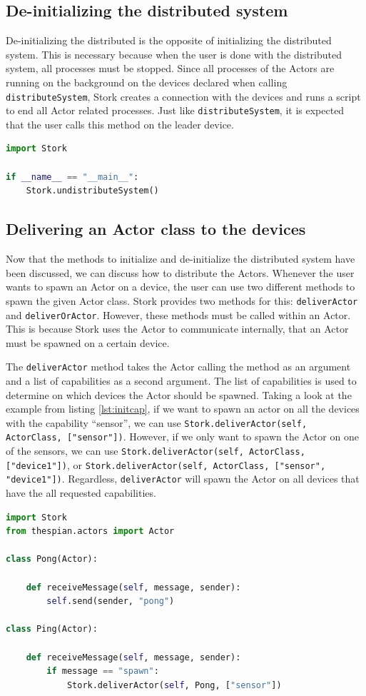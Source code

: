 \documentclass[a4paper]{article}
\begin{document}
\subsection{De-initializing the distributed system}
De-initializing the distributed is the opposite of initializing the distributed system. This is necessary because when the user is done with the distributed system, all processes must be stopped. Since all processes of the Actors are running on the background on the devices declared when calling \lstinline{distributeSystem}, Stork creates a connection with the devices and runs a script to end all Actor related processes. Just like \lstinline{distributeSystem}, it is expected that the user calls this method on the leader device.
\begin{lstlisting}[language=Python, caption=De-initializing the distributed system, label=lst:deinit]
import Stork

if __name__ == "__main__":
    Stork.undistributeSystem()
\end{lstlisting}
\subsection{Delivering an Actor class to the devices}
Now that the methods to initialize and de-initialize the distributed system have been discussed, we can discuss how to distribute the Actors. Whenever the user wants to spawn an Actor on a device, the user can use two different methods to spawn the given Actor class. Stork provides two methods for this: \lstinline|deliverActor| and \lstinline|deliverOrActor|. However, these methods must be called within an Actor. This is because Stork uses the Actor to communicate internally, that an Actor must be spawned on a certain device.

The \lstinline{deliverActor} method takes the Actor calling the method as an argument and a list of capabilities as a second argument. The list of capabilities is used to determine on which devices the Actor should be spawned. Taking a look at the example from listing \ref{lst:initcap}, if we want to spawn an actor on all the devices with the capability \enquote{sensor}, we can use \lstinline{Stork.deliverActor(self, ActorClass, ["sensor"])}. However, if we only want to spawn the Actor on one of the sensors, we can use \lstinline{Stork.deliverActor(self, ActorClass, ["device1"])}, or \lstinline{Stork.deliverActor(self, ActorClass, ["sensor", "device1"])}. Regardless, \lstinline{deliverActor} will spawn the Actor on all devices that have the all requested capabilities.
\vfill
\begin{lstlisting}[language=Python, caption=Delivering an Actor, label=lst:deliverActor]
import Stork
from thespian.actors import Actor

class Pong(Actor):

    def receiveMessage(self, message, sender):
        self.send(sender, "pong")

class Ping(Actor):

    def receiveMessage(self, message, sender):
        if message == "spawn":
            Stork.deliverActor(self, Pong, ["sensor"])
\end{lstlisting}
\end{document}

